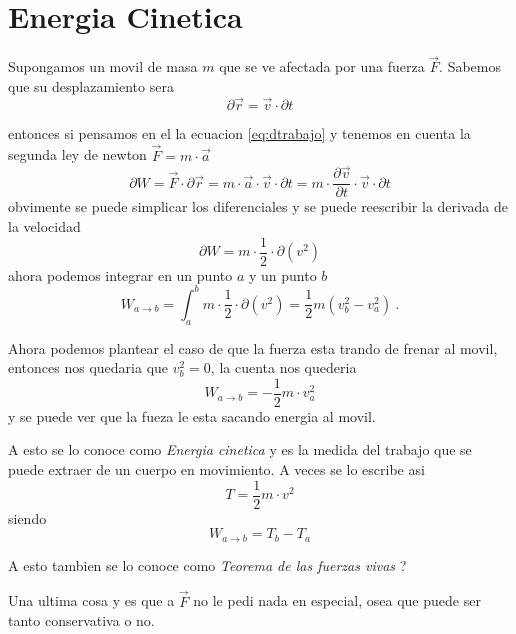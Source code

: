 \documentclass[../Main.tex]{subfiles}
\begin{document}
{
    \section{Energia Cinetica}
    Supongamos un movil de masa $m$ que se ve afectada por una fuerza $\vec{F}$.
    Sabemos que su desplazamiento sera
    \begin{equation*}
        \partial \vec{r} = \vec{v} \cdot \partial t
    \end{equation*}

    entonces si pensamos en el la ecuacion \ref{eq:dtrabajo} y tenemos en cuenta la
    segunda ley de newton $\vec{F} = m \cdot \vec{a}$
    \begin{equation*}
        \partial W = \vec{F} \cdot \partial \vec{r} = m \cdot \vec{a} \cdot \vec{v} \cdot \partial t = m \cdot \frac{\partial \vec{v}}{\partial t} \cdot \vec{v} \cdot \partial t
    \end{equation*}
    obvimente se puede simplicar los diferenciales y se puede reescribir la derivada
    de la velocidad
    \begin{equation*}
        \partial W =  m \cdot \frac{1}{2} \cdot \partial \left( v^2 \right)
    \end{equation*}
    ahora podemos integrar en un punto $a$ y un punto $b$ 
    \begin{equation}
        W_{a \rightarrow b} = \int _a ^b m \cdot \frac{1}{2} \cdot \partial \left( v^2 \right) = \frac{1}{2} m \left( v_b^2 - v_a^2 \right) \ .
    \end{equation}

    Ahora podemos plantear el caso de que la fuerza esta trando de frenar al movil,
    entonces nos quedaria que $v_b^2 = 0$, la cuenta nos quederia
    \begin{equation}
        W_{a \rightarrow b} = - \frac{1}{2} m  \cdot v_a^2
    \end{equation}
    y se puede ver que la fueza le esta sacando energia al movil.

    A esto se lo conoce como \textit{Energia cinetica} y es la medida del trabajo
    que se puede extraer de un cuerpo en movimiento. A veces se lo escribe asi
    \begin{equation}
        T = \frac{1}{2} m  \cdot v^2
    \end{equation}
    siendo
    \begin{equation*}
        W_{a \rightarrow b} = T_b - T_a
    \end{equation*}

    A esto tambien se lo conoce como \textit{Teorema de las fuerzas vivas} ?

    Una ultima cosa y es que a $\vec{F}$ no le pedi nada en especial, osea que
    puede ser tanto conservativa o no.

}
\end{document}

